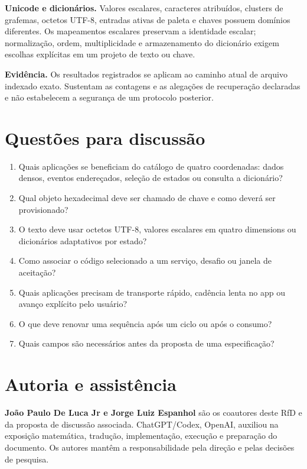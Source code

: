 \documentclass[
  11pt,
  a4paper,
]{article}
\providecommand{\tightlist}{%
  \setlength{\itemsep}{0pt}\setlength{\parskip}{0pt}}
\begin{document}
\textbf{Unicode e dicionários.} Valores escalares, caracteres
atribuídos, clusters de grafemas, octetos UTF-8, entradas ativas de
paleta e chaves possuem domínios diferentes. Os mapeamentos escalares
preservam a identidade escalar; normalização, ordem, multiplicidade e
armazenamento do dicionário exigem escolhas explícitas em um projeto de
texto ou chave.

\textbf{Evidência.} Os resultados registrados se aplicam ao caminho
atual de arquivo indexado exato. Sustentam as contagens e as alegações
de recuperação declaradas e não estabelecem a segurança de um protocolo
posterior.

\hypertarget{questuxf5es-para-discussuxe3o}{%
\section{Questões para discussão}\label{questuxf5es-para-discussuxe3o}}

\begin{enumerate}
\def\labelenumi{\arabic{enumi}.}
\tightlist
\item
  Quais aplicações se beneficiam do catálogo de quatro coordenadas:
  dados densos, eventos endereçados, seleção de estados ou consulta a
  dicionário?
\item
  Qual objeto hexadecimal deve ser chamado de chave e como deverá ser
  provisionado?
\item
  O texto deve usar octetos UTF-8, valores escalares em quatro
  dimensions ou dicionários adaptativos por estado?
\item
  Como associar o código selecionado a um serviço, desafio ou janela de
  aceitação?
\item
  Quais aplicações precisam de transporte rápido, cadência lenta no app
  ou avanço explícito pelo usuário?
\item
  O que deve renovar uma sequência após um ciclo ou após o consumo?
\item
  Quais campos são necessários antes da proposta de uma especificação?
\end{enumerate}

\hypertarget{autoria-e-assistuxeancia}{%
\section{Autoria e assistência}\label{autoria-e-assistuxeancia}}

\textbf{João Paulo De Luca Jr e Jorge Luiz Espanhol} são os coautores
deste RfD e da proposta de discussão associada. ChatGPT/Codex, OpenAI,
auxiliou na exposição matemática, tradução, implementação, execução e
preparação do documento. Os autores mantêm a responsabilidade pela
direção e pelas decisões de pesquisa.
\end{document}
